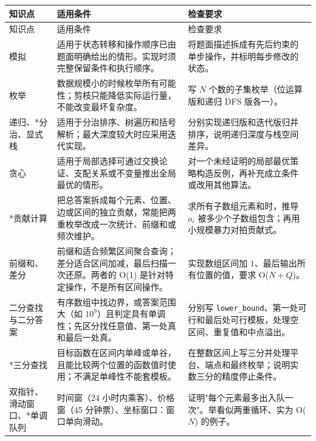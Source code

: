 \documentclass[a4paper,11pt]{article}
\newcommand{\code}[1]{\texttt{#1}}
\begin{document}
\begin{longtable}{L{2.4cm} L{7.5cm} L{6.8cm}}
\toprule
知识点 & 适用条件 & 检查要求 \\
\midrule
\endfirsthead
\toprule
知识点 & 适用条件 & 检查要求 \\
\midrule
\endhead
\endfoot
\bottomrule
\endlastfoot

模拟
& 适用于状态转移和操作顺序已由题面明确给出的情形。实现时须完整保留条件和执行顺序。
& 将题面描述拆成有先后约束的单步操作，并标明每步修改的状态。 \\[2mm]

枚举
& 数据规模小的时候枚举所有可能性；剪枝只能降低实际运行量，不能改变最坏复杂度。
& 写 $N$ 个数的子集枚举（位运算版和递归 DFS 版各一）。 \\[2mm]

递归、*分治、显式栈
& 适用于分治排序、树遍历和括号解析；最大深度较大时应采用迭代实现。
& 分别实现递归版和迭代版归并排序，说明递归深度与栈空间差异。 \\[2mm]

贪心
& 适用于局部选择可通过交换论证、支配关系或不变量推出全局最优的情形。
& 对一个未经证明的局部最优策略构造反例，再补充成立条件或改用其他算法。 \\[2mm]

*贡献计算
& 把总答案拆成每个元素、位置、边或区间的独立贡献，常能把两重枚举改成一次统计、前缀和或频次维护。
& 求所有子数组元素和时，推导 $a_i$ 被多少个子数组包含；再用小规模暴力对拍贡献式。 \\[2mm]

前缀和、差分
& 前缀和适合频繁区间聚合查询；差分适合区间加减，最后扫描一次还原。两者的 O(1) 是针对特定操作，不是所有区间操作。
& 实现数组区间加 $1$、最后输出所有位置的值，要求 O($N+Q$)。 \\[2mm]

二分查找与二分答案
& 有序数组中找边界，或答案范围大（如 $10^9$）且判定具有单调性；先区分找任意值、第一处真和最后一处真。
& 分别写 \code{lower\_bound}、第一处可行和最后处可行模板，处理空区间、重复值和中点溢出。 \\[2mm]

*三分查找
& 目标函数在区间内单峰或单谷，且能比较两个位置的函数值时使用；不满足单峰性不能套模板。
& 在整数区间上写三分并处理平台、端点和最终枚举；说明实数三分的精度停止条件。 \\[2mm]

双指针、滑动窗口、*单调队列
& 时间窗（24 小时内乘客）、价格窗（45 分钟票）、坐标窗口：窗口单向滑动。
& 证明"每个元素最多出入队一次"。举看似两重循环、实为 O($N$) 的例子。 \\[2mm]


\end{longtable}
\end{document}
